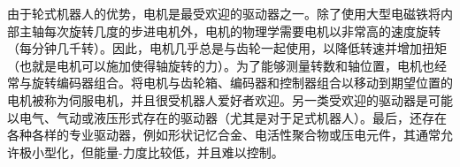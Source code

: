 
由于轮式机器人的优势，电机是最受欢迎的驱动器之一。除了使用大型电磁铁将内部主轴每次旋转几度的步进电机外，电机的物理学需要电机以非常高的速度旋转（每分钟几千转）。因此，电机几乎总是与齿轮一起使用，以降低转速并增加扭矩（也就是电机可以施加使得轴旋转的力）。为了能够测量转数和轴位置，电机也经常与旋转编码器组合。将电机与齿轮箱、编码器和控制器组合以移动到期望位置的电机被称为伺服电机，并且很受机器人爱好者欢迎。另一类受欢迎的驱动器是可能以电气、气动或液压形式存在的驱动器（尤其是对于足式机器人）。最后，还存在各种各样的专业驱动器，例如形状记忆合金、电活性聚合物或压电元件，其通常允许极小型化，但能量-力度比较低，并且难以控制。


